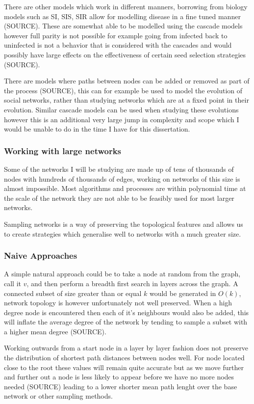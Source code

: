 \documentclass{article}
\begin{document}
There are other models which work in different manners, borrowing from biology models such as SI, SIS, SIR allow for modelling disease in a fine tuned manner (SOURCE). These are somewhat able to be modelled using the cascade models however full parity is not possible for example going from infected back to uninfected is not a behavior that is considered with the cascades and would possibly have large effects on the effectiveness of certain seed selection strategies (SOURCE).

There are models where paths between nodes can be added or removed as part of the process (SOURCE), this can for example be used to model the evolution of social networks, rather than studying networks which are at a fixed point in their evolution.
Similar cascade models can be used when studying these evolutions however this is an additional very large jump in complexity and scope which I would be unable to do in the time I have for this dissertation.

\subsubsection{Working with large networks}

Some of the networks I will be studying are made up of tens of thousands of nodes with hundreds of thousands of edges, working on networks of this size is almost impossible.
Most algorithms and processes are within polynomial time at the scale of the network they are not able to be feasibly used for most larger networks.

Sampling networks is a way of preserving the topological features and allows us to create strategies which generalise well to networks with a much greater size.

\subsubsection{Naive Approaches}
A simple natural approach could be to take a node at random from the graph, call it $v$, and then perform a breadth first search in layers across the graph.
A connected subset of size greater than or equal $k$ would be generated in $O(k)$, network topology is however unfortunately not well preserved.
When a high degree node is encountered then each of it's neighbours would also be added, this will inflate the average degree of the network by tending to sample a subset with a higher mean degree (SOURCE).

Working outwards from a start node in a layer by layer fashion does not preserve the distribution of shortest path distances between nodes well.
For node located close to the root these values will remain quite accurate but as we move further and further out a node is less likely to appear before we have no more nodes needed (SOURCE) leading to a lower shorter mean path lenght over the base network or other sampling methods.
\end{document}
